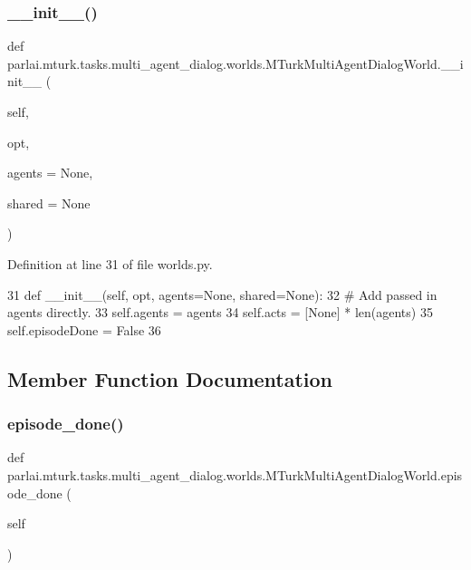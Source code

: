 \subsubsection{\texorpdfstring{\+\_\+\+\_\+init\+\_\+\+\_\+()}{\_\_init\_\_()}}
{\footnotesize\ttfamily def parlai.\+mturk.\+tasks.\+multi\+\_\+agent\+\_\+dialog.\+worlds.\+M\+Turk\+Multi\+Agent\+Dialog\+World.\+\_\+\+\_\+init\+\_\+\+\_\+ (\begin{DoxyParamCaption}\item[{}]{self,  }\item[{}]{opt,  }\item[{}]{agents = {\ttfamily None},  }\item[{}]{shared = {\ttfamily None} }\end{DoxyParamCaption})}



Definition at line 31 of file worlds.\+py.


\begin{DoxyCode}
31     \textcolor{keyword}{def }\_\_init\_\_(self, opt, agents=None, shared=None):
32         \textcolor{comment}{# Add passed in agents directly.}
33         self.agents = agents
34         self.acts = [\textcolor{keywordtype}{None}] * len(agents)
35         self.episodeDone = \textcolor{keyword}{False}
36 
\end{DoxyCode}


\subsection{Member Function Documentation}
\mbox{\label{classparlai_1_1mturk_1_1tasks_1_1multi__agent__dialog_1_1worlds_1_1MTurkMultiAgentDialogWorld_a6d0019855df42d0a383b039368f17652}} 
\subsubsection{\texorpdfstring{episode\+\_\+done()}{episode\_done()}}
{\footnotesize\ttfamily def parlai.\+mturk.\+tasks.\+multi\+\_\+agent\+\_\+dialog.\+worlds.\+M\+Turk\+Multi\+Agent\+Dialog\+World.\+episode\+\_\+done (\begin{DoxyParamCaption}\item[{}]{self }\end{DoxyParamCaption})}



